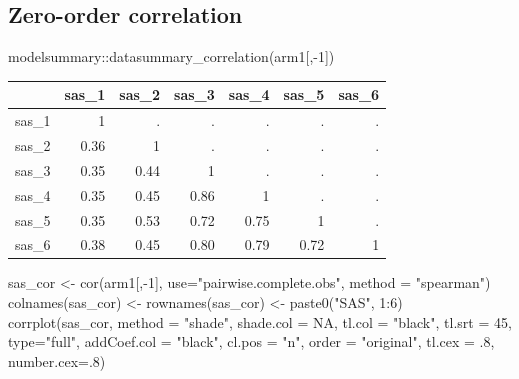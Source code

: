 \documentclass[
  letterpaper,
  DIV=11,
  numbers=noendperiod]{scrreprt}
\newenvironment{Shaded}{\begin{snugshade}}{\end{snugshade}}
\newcommand{\AttributeTok}[1]{\textcolor[rgb]{0.40,0.45,0.13}{#1}}
\newcommand{\ConstantTok}[1]{\textcolor[rgb]{0.56,0.35,0.01}{#1}}
\newcommand{\DecValTok}[1]{\textcolor[rgb]{0.68,0.00,0.00}{#1}}
\newcommand{\FunctionTok}[1]{\textcolor[rgb]{0.28,0.35,0.67}{#1}}
\newcommand{\NormalTok}[1]{\textcolor[rgb]{0.00,0.23,0.31}{#1}}
\newcommand{\OtherTok}[1]{\textcolor[rgb]{0.00,0.23,0.31}{#1}}
\newcommand{\SpecialCharTok}[1]{\textcolor[rgb]{0.37,0.37,0.37}{#1}}
\newcommand{\StringTok}[1]{\textcolor[rgb]{0.13,0.47,0.30}{#1}}
\begin{document}
\hypertarget{zero-order-correlation}{%
\subsection{Zero-order correlation}\label{zero-order-correlation}}

\begin{Shaded}
\begin{Highlighting}[]
\NormalTok{modelsummary}\SpecialCharTok{::}\FunctionTok{datasummary\_correlation}\NormalTok{(arm1[,}\SpecialCharTok{{-}}\DecValTok{1}\NormalTok{])}
\end{Highlighting}
\end{Shaded}

\begin{table}
\centering
\begin{tabular}[t]{lrrrrrr}
\toprule
  & sas\_1 & sas\_2 & sas\_3 & sas\_4 & sas\_5 & sas\_6\\
\midrule
sas\_1 & 1 & . & . & . & . & .\\
sas\_2 & \num{.36} & 1 & . & . & . & .\\
sas\_3 & \num{.35} & \num{.44} & 1 & . & . & .\\
sas\_4 & \num{.35} & \num{.45} & \num{.86} & 1 & . & .\\
sas\_5 & \num{.35} & \num{.53} & \num{.72} & \num{.75} & 1 & .\\
sas\_6 & \num{.38} & \num{.45} & \num{.80} & \num{.79} & \num{.72} & 1\\
\bottomrule
\end{tabular}
\end{table}

\begin{Shaded}
\begin{Highlighting}[]
\NormalTok{sas\_cor }\OtherTok{\textless{}{-}} \FunctionTok{cor}\NormalTok{(arm1[,}\SpecialCharTok{{-}}\DecValTok{1}\NormalTok{], }\AttributeTok{use=}\StringTok{"pairwise.complete.obs"}\NormalTok{, }\AttributeTok{method =} \StringTok{"spearman"}\NormalTok{)}
\FunctionTok{colnames}\NormalTok{(sas\_cor) }\OtherTok{\textless{}{-}} \FunctionTok{rownames}\NormalTok{(sas\_cor) }\OtherTok{\textless{}{-}}  \FunctionTok{paste0}\NormalTok{(}\StringTok{"SAS"}\NormalTok{, }\DecValTok{1}\SpecialCharTok{:}\DecValTok{6}\NormalTok{)}
\FunctionTok{corrplot}\NormalTok{(sas\_cor, }\AttributeTok{method =} \StringTok{"shade"}\NormalTok{, }\AttributeTok{shade.col =} \ConstantTok{NA}\NormalTok{, }\AttributeTok{tl.col =} \StringTok{"black"}\NormalTok{, }\AttributeTok{tl.srt =} \DecValTok{45}\NormalTok{, }\AttributeTok{type=}\StringTok{"full"}\NormalTok{, }
          \AttributeTok{addCoef.col =} \StringTok{"black"}\NormalTok{, }\AttributeTok{cl.pos =} \StringTok{"n"}\NormalTok{, }\AttributeTok{order =} \StringTok{"original"}\NormalTok{, }\AttributeTok{tl.cex =}\NormalTok{ .}\DecValTok{8}\NormalTok{, }\AttributeTok{number.cex=}\NormalTok{.}\DecValTok{8}\NormalTok{)}
\end{Highlighting}
\end{Shaded}
\end{document}
